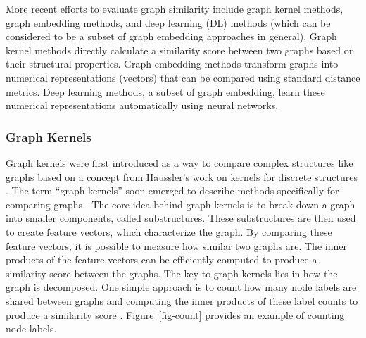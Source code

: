 \documentclass[
  super,
  preprint,
  3p]{elsarticle}
\begin{document}
More recent efforts to evaluate graph similarity include graph kernel
methods, graph embedding methods, and deep learning (DL) methods (which
can be considered to be a subset of graph embedding approaches in
general). Graph kernel methods directly calculate a similarity score
between two graphs based on their structural properties. Graph embedding
methods transform graphs into numerical representations (vectors) that
can be compared using standard distance metrics. Deep learning methods,
a subset of graph embedding, learn these numerical representations
automatically using neural networks.

\subsubsection{Graph Kernels}\label{graph-kernels}

Graph kernels were first introduced as a way to compare complex
structures like graphs based on a concept from Haussler's work on
kernels for discrete structures \citep{kondor_diffusion_2002}. The term
``graph kernels'' soon emerged to describe methods specifically for
comparing graphs \citep{RN27, RN45, scholkopf_fast_2007}. The core idea
behind graph kernels is to break down a graph into smaller components,
called substructures. These substructures are then used to create
feature vectors, which characterize the graph. By comparing these
feature vectors, it is possible to measure how similar two graphs are.
The inner products of the feature vectors can be efficiently computed to
produce a similarity score between the graphs. The key to graph kernels
lies in how the graph is decomposed. One simple approach is to count how
many node labels are shared between graphs and computing the inner
products of these label counts to produce a similarity score
\citep{kriege_survey_2020}. Figure~\ref{fig-count} provides an example
of counting node labels.
\end{document}
